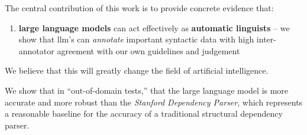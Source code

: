 \label{sec:contributions}
The central contribution of this work is to provide concrete evidence that:
\begin{enumerate}
    \item {\bf large language models} can act effectively as {\bf automatic linguists} -- we show that llm's can {\em annotate} important syntactic data with high inter-annotator agreement with our own guidelines and judgement
\end{enumerate}
We believe that this will greatly change the field of artificial intelligence.

We show that in ``out-of-domain tests,'' that the large language model is more accurate and more robust than the {\em Stanford Dependency Parser}, which represents a reasonable baseline for the accuracy of a traditional structural dependency parser.


